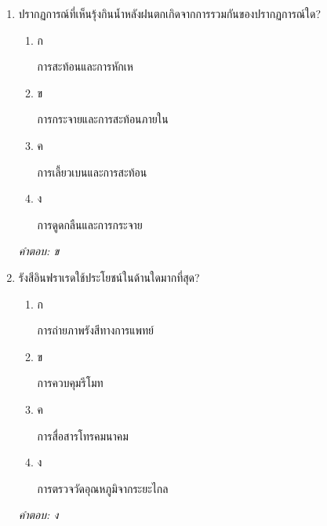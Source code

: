 \documentclass[12pt]{article}
\begin{document}
\begin{enumerate}[label=\arabic*., itemsep=0.5\baselineskip, topsep=0.5\baselineskip, leftmargin=*]
\item ปรากฏการณ์ที่เห็นรุ้งกินน้ำหลังฝนตกเกิดจากการรวมกันของปรากฏการณ์ใด?
\begin{enumerate}[label=\alph*)., itemsep=0.3\baselineskip, topsep=0.3\baselineskip]
\item ก\ 
\begin{minipage}[t]{0.9\linewidth}
\raggedright การสะท้อนและการหักเห
\end{minipage}
\item ข\ 
\begin{minipage}[t]{0.9\linewidth}
\raggedright การกระจายและการสะท้อนภายใน
\end{minipage}
\item ค\ 
\begin{minipage}[t]{0.9\linewidth}
\raggedright การเลี้ยวเบนและการสะท้อน
\end{minipage}
\item ง\ 
\begin{minipage}[t]{0.9\linewidth}
\raggedright การดูดกลืนและการกระจาย
\end{minipage}
\end{enumerate}
\vspace{-0.3\baselineskip}
\begin{small}
\textit{คำตอบ: ข}
\end{small}

\item รังสีอินฟราเรดใช้ประโยชน์ในด้านใดมากที่สุด?
\begin{enumerate}[label=\alph*)., itemsep=0.3\baselineskip, topsep=0.3\baselineskip]
\item ก\ 
\begin{minipage}[t]{0.9\linewidth}
\raggedright การถ่ายภาพรังสีทางการแพทย์
\end{minipage}
\item ข\ 
\begin{minipage}[t]{0.9\linewidth}
\raggedright การควบคุมรีโมท
\end{minipage}
\item ค\ 
\begin{minipage}[t]{0.9\linewidth}
\raggedright การสื่อสารโทรคมนาคม
\end{minipage}
\item ง\ 
\begin{minipage}[t]{0.9\linewidth}
\raggedright การตรวจวัดอุณหภูมิจากระยะไกล
\end{minipage}
\end{enumerate}
\vspace{-0.3\baselineskip}
\begin{small}
\textit{คำตอบ: ง}
\end{small}


\end{enumerate}
\end{document}
